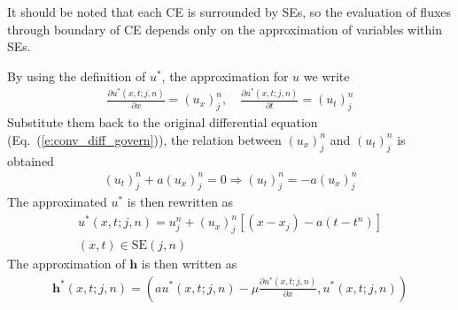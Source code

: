 \documentclass{turgon}
\begin{document}
It should be noted that each CE is surrounded by SEs, so the evaluation of
fluxes through boundary of CE depends only on the approximation of variables
within SEs.

By using the definition of $u^*$, the approximation for $u$
we write
\begin{align*}
  \frac{\partial u^*(x,t;j,n)}{\partial x} = (u_x)_j^n, \quad
  \frac{\partial u^*(x,t;j,n)}{\partial t} = (u_t)_j^n
\end{align*}
Substitute them back to the original differential equation
(Eq.~(\ref{e:conv_diff_govern})), the relation between $(u_x)_j^n$ and
$(u_t)_j^n$ is obtained
\begin{align*}
              (u_t)_j^n + a(u_x)_j^n = 0
  \Rightarrow (u_t)_j^n = -a(u_x)_j^n
\end{align*}
The approximated $u^*$ is then rewritten as
\begin{gather*}
  u^*(x,t;j,n) = u_j^n + (u_x)_j^n[(x-x_j) - a(t-t^n)] \\
  (x,t) \in \mathrm{SE}(j,n)
\end{gather*}
The approximation of $\mathbf{h}$ is then written as
\begin{align*}
  \mathbf{h}^*(x,t;j,n) =
  \left(
    au^*(x,t;j,n)-\mu\frac{\partial u^*(x,t;j,n)}{\partial x}, u^*(x,t;j,n)
  \right)
\end{align*}
\end{document}
